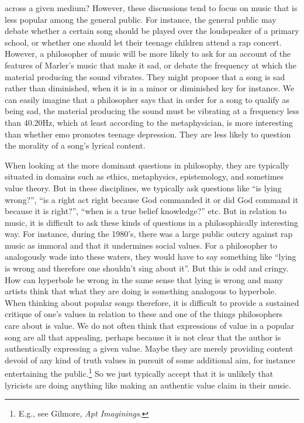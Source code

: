 \documentclass[phdthesis,12pt,final]{wuthesis}
\theoremstyle{definition}
\theoremstyle{definition}
\theoremstyle{definition}
\theoremstyle{definition}
\theoremstyle{remark}
\begin{document}
across a given medium? However, these discussions tend to focus on music that is less popular among the general public. For instance, the general public may debate whether a certain song should be played over the loudspeaker of a primary school, or whether one should let their teenage children attend a rap concert. However, a philosopher of music will be more likely to ask for an account of the features of Marler's music that make it sad, or debate the frequency at which the material producing the sound vibrates. They might propose that a song is sad rather than diminished, when it is in a minor or diminished key for instance. We can easily imagine that a philosopher says that in order for a song to qualify as being sad, the material producing the sound must be vibrating at a frequency less than 40.20Hz, which at least according to the metaphysician, is more interesting than whether emo promotes teenage depression. They are less likely to question the morality of a song's lyrical content.

When looking at the more dominant questions in philosophy, they are typically situated in domains such as ethics, metaphysics, epistemology, and sometimes value theory. But in these disciplines, we typically ask questions like ``is lying wrong?'', ``is a right act right because God commanded it or did God command it because it is right?'', ``when is a true belief knowledge?'' etc. But in relation to music, it is difficult to ask these kinds of questions in a philosophically interesting way. For instance, during the 1980's, there was a large public outcry against rap music as immoral and that it undermines social values. For a philosopher to analogously wade into these waters, they would have to say something like ``lying is wrong and therefore one shouldn't sing about it''. But this is odd and cringy. How can hyperbole be wrong in the same sense that lying is wrong and many artists think that what they are doing is something analogous to hyperbole. When thinking about popular songs therefore, it is difficult to provide a sustained critique of one's values in relation to these and one of the things philosophers care about is value. We do not often think that expressions of value in a popular song are all that appealing, perhaps because it is not clear that the author is authentically expressing a given value. Maybe they are merely providing content devoid of any kind of truth values in pursuit of some additional aim, for instance entertaining the public.\footnote{E.g., see Gilmore, \emph{Apt {Imaginings}}.} So we just typically accept that it is unlikely that lyricists are doing anything like making an authentic value claim in their music.
\end{document}
